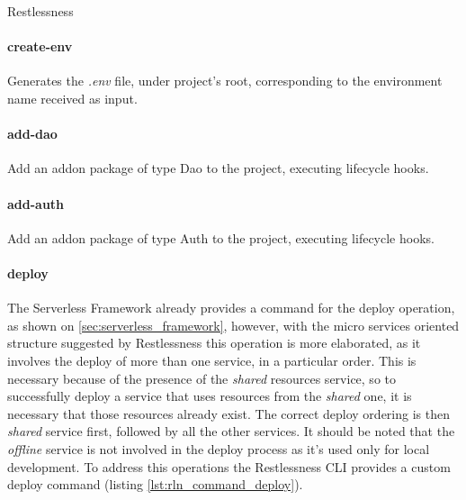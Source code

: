 \begin{chapter}{Restlessness}
    \paragraph{create-env}
    Generates the \textit{.env} file, under project's root, corresponding to the
    environment name received as input.

    \paragraph{add-dao}
    Add an addon package of type Dao to the project, executing lifecycle hooks.

    \paragraph{add-auth}
    Add an addon package of type Auth to the project, executing lifecycle hooks.

    \paragraph{deploy}
    The Serverless Framework already provides a command for the deploy operation,
    as shown on \ref{sec:serverless_framework}, however, with the micro services
    oriented structure suggested by Restlessness this operation is more elaborated,
    as it involves the deploy of more than one service, in a particular order.
    This is necessary because of the presence of the \textit{shared} resources
    service, so to successfully deploy a service that uses resources from the
    \textit{shared} one, it is necessary that those resources already exist.
    The correct deploy ordering is then \textit{shared} service first, followed
    by all the other services.
    It should be noted that the \textit{offline} service is not involved in the
    deploy process as it's used only for local development.
    To address this operations the Restlessness CLI provides a custom deploy
    command (listing \ref{lst:rln_command_deploy}).

    \bigskip


\end{chapter}
